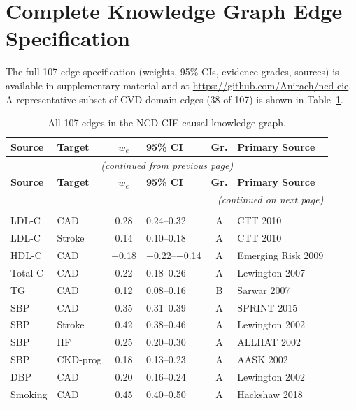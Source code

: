 \documentclass[runningheads]{llncs}
\begin{document}
\appendix
\section{Complete Knowledge Graph Edge Specification}\label{app:edges}

The full 107-edge specification (weights, 95\% CIs, evidence grades,
sources) is available in supplementary material and at
\url{https://github.com/Anirach/ncd-cie}.
A representative subset of CVD-domain edges (38 of 107) is shown in
Table~\ref{tab:edges}.

{\footnotesize
\renewcommand{\arraystretch}{1.05}
\begin{longtable}{@{}p{2.0cm}p{2.0cm}cp{1.4cm}cp{2.8cm}@{}}
\caption{All 107 edges in the NCD-CIE causal knowledge graph.}\label{tab:edges}\\
\toprule
\textbf{Source} & \textbf{Target} & \textbf{$w_e$} & \textbf{95\% CI} & \textbf{Gr.} & \textbf{Primary Source} \\
\midrule
\endfirsthead
\multicolumn{6}{c}{\small\itshape (continued from previous page)} \\
\toprule
\textbf{Source} & \textbf{Target} & \textbf{$w_e$} & \textbf{95\% CI} & \textbf{Gr.} & \textbf{Primary Source} \\
\midrule
\endhead
\midrule
\multicolumn{6}{r}{\small\itshape (continued on next page)} \\
\endfoot
\bottomrule
\endlastfoot
\multicolumn{6}{l}{\textbf{CVD Domain (38 edges)}} \\
\midrule
LDL-C & CAD & 0.28 & 0.24--0.32 & A & CTT 2010 \\
LDL-C & Stroke & 0.14 & 0.10--0.18 & A & CTT 2010 \\
HDL-C & CAD & $-$0.18 & $-$0.22--$-$0.14 & A & Emerging Risk 2009 \\
Total-C & CAD & 0.22 & 0.18--0.26 & A & Lewington 2007 \\
TG & CAD & 0.12 & 0.08--0.16 & B & Sarwar 2007 \\
SBP & CAD & 0.35 & 0.31--0.39 & A & SPRINT 2015 \\
SBP & Stroke & 0.42 & 0.38--0.46 & A & Lewington 2002 \\
SBP & HF & 0.25 & 0.20--0.30 & A & ALLHAT 2002 \\
SBP & CKD-prog & 0.18 & 0.13--0.23 & A & AASK 2002 \\
DBP & CAD & 0.20 & 0.16--0.24 & A & Lewington 2002 \\
Smoking & CAD & 0.45 & 0.40--0.50 & A & Hackshaw 2018 \\

\end{longtable}}
\end{document}
